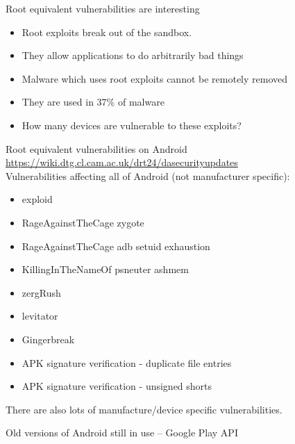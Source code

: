 \documentclass{beamer}
\begin{document}
\begin{frame}{Root equivalent vulnerabilities are interesting}{}
 \begin{itemize}
  \item Root exploits break out of the sandbox.
  \note{}
  \item They allow applications to do arbitrarily bad things
  \item Malware which uses root exploits cannot be remotely removed
  \item They are used in 37\% of malware %
  \item How many devices are vulnerable to these exploits?
 \end{itemize}
\end{frame}

\begin{frame}{Root equivalent vulnerabilities on Android}{}
\small \url{https://wiki.dtg.cl.cam.ac.uk/drt24/dasecurityupdates}\\
Vulnerabilities affecting all of Android (not manufacturer specific):
 \begin{itemize}
  \item exploid
  \item RageAgainstTheCage zygote
  \item RageAgainstTheCage adb setuid exhaustion
  \item KillingInTheNameOf psneuter ashmem
  \item zergRush
  \item levitator
  \item Gingerbreak
  \item APK signature verification - duplicate file entries
  \item APK signature verification - unsigned shorts
 \end{itemize}
There are also lots of manufacture/device specific vulnerabilities.
\end{frame}

\begin{frame}{Old versions of Android still in use -- Google Play API}{}
 \begin{center}
 \end{center}
\end{frame}
\end{document}
